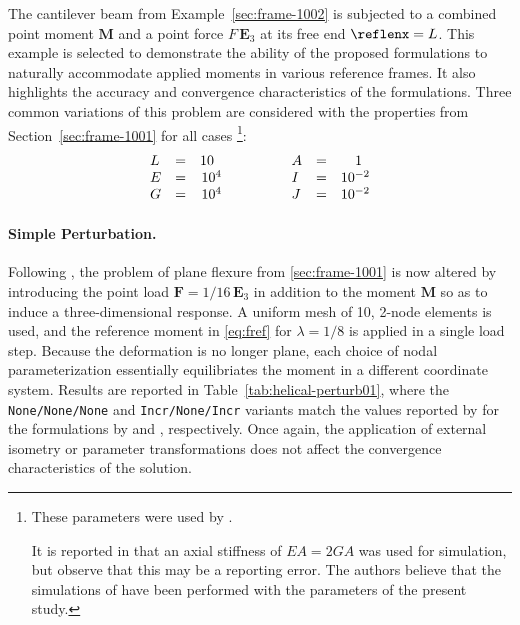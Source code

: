 %
%
%
The cantilever beam 
from Example~\ref{sec:frame-1002} is subjected to a combined point moment \(\bm{M}\) 
and a point force \(F \, \mathbf{E}_3\) at its free end \(\reflenx=L\).
%
This example is selected to demonstrate the ability of the proposed formulations 
to naturally accommodate applied moments in various reference frames.
It also highlights the accuracy and convergence characteristics of the formulations.
Three common variations of this problem are considered
with the properties from Section~\ref{sec:frame-1001} for all cases
\footnote{These parameters were used by \cite{ritto-corrêa2002differentiation,ibrahimbegovic1997choice}.

It is reported in \cite{ibrahimbegović1995computational} that an axial stiffness of \(EA=2GA\)
was used for simulation, but \cite{ritto-corrêa2002differentiation} observe that this may be a reporting error. The authors believe that the simulations of \cite{ibrahimbegović1995computational}
have been performed with the parameters of the present study.
}:
\[
\begin{array}{lcr}
    L  &=&    10\hphantom{..}    \\ %
    E  &=&    10^4  \\ %
    G  &=&    10^4  \\ %
\end{array}
\qquad\qquad
\begin{array}{lcr}
    A  &=& 1\hphantom{..} \\
    I  &=& 10^{-2} \\
    J  &=& 10^{-2} \\
\end{array}
\]
%
%
\paragraph{Simple Perturbation.}\label{sec:frame-1006}
Following \cite{ibrahimbegović1995computational}, the problem of plane flexure from \cref{sec:frame-1001} is now altered by introducing the point load
\(\bm{F} = 1/16 \, \mathbf{E}_3\) in addition to the moment \(\bm{M}\) so as to induce
a three-dimensional response. 
A uniform mesh of 10, 2-node  elements is used, and the reference moment in \eqref{eq:fref} for \(\lambda = 1/8\) is applied in a single load step. 
Because the deformation is no longer plane, each choice of nodal parameterization essentially equilibriates the moment in a different coordinate system. %
Results are reported in Table~\ref{tab:helical-perturb01}, where the \texttt{None/None/None} and \texttt{Incr/None/Incr} 
variants match the values reported by \cite{ibrahimbegović1995computational} for the formulations by 
\cite{simo1986threedimensional} and \cite{ibrahimbegović1995computational}, respectively.
Once again, the application of external isometry or parameter transformations does not affect the convergence characteristics of the solution.
%


